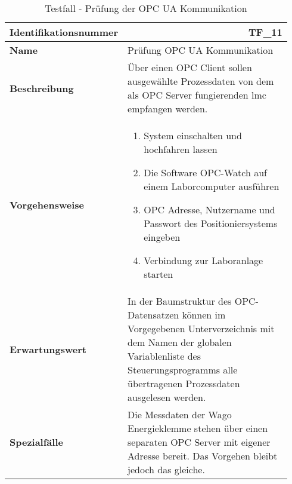 \documentclass[../../../Bachelorarbeit.tex]{subfiles}
\begin{document}
\begin{table}[H]
    \centering
    \begin{tabular}{ p{0.34\linewidth}  p{0.6\linewidth} }
        \hline
        \textbf{Identifikationsnummer}  & \multicolumn{1}{r}{TF\_11} \\ \hline
        \textbf{Name}                   & Prüfung OPC UA Kommunikation \\
        \textbf{Beschreibung}           & Über einen OPC Client sollen ausgewählte Prozessdaten von dem als OPC Server fungierenden \acs{lmc} empfangen werden. \\
        \textbf{Vorgehensweise}         &   {\begin{enumerate}[noitemsep,topsep=0pt,parsep=0pt,partopsep=0pt,leftmargin=*]
                                                \item System einschalten und hochfahren lassen
                                                \item Die Software OPC-Watch auf einem Laborcomputer ausführen
                                                \item OPC Adresse, Nutzername und Passwort des Positioniersystems eingeben
                                                \item Verbindung zur Laboranlage starten
                                            \end{enumerate}} \\
        \textbf{Erwartungswert}         & In der Baumstruktur des OPC-Datensatzen können im Vorgegebenen Unterverzeichnis mit dem Namen der globalen Variablenliste des Steuerungsprogramms alle übertragenen Prozessdaten ausgelesen werden. \\
        \textbf{Spezialfälle}           & Die Messdaten der Wago Energieklemme stehen über einen separaten OPC Server mit eigener Adresse bereit. Das Vorgehen bleibt jedoch das gleiche. \\ \hline
    \end{tabular}
    \caption[\acs{tf} - OPC UA Komminikation]{Testfall - Prüfung der OPC UA Kommunikation}
    \label{tab:my-table80}
\end{table}
\end{document}
